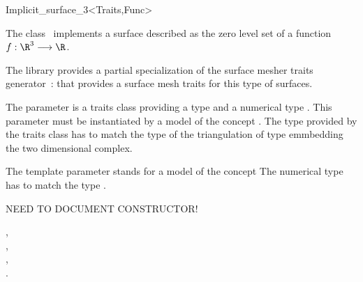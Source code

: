 

\begin{ccRefClass}{Implicit_surface_3<Traits,Func>}


\ccDefinition
  
The class \ccRefName\  implements a surface described 
as the zero level
set  of a function $f : \R^3 \longrightarrow \R$.


The library provides a partial specialization
of the  surface mesher traits generator~:
that provides a surface mesh traits for this type of surfaces.


The parameter  is a traits class providing 
a type  and a numerical type .
This parameter  must be instantiated by 
a model of the concept .
The  type provided by the traits class  
has to match  the  type of the
triangulation of  type  emmbedding
the two dimensional complex.

The template parameter   stands for a model
of the concept 
The numerical type  has to match
the type .

NEED TO DOCUMENT CONSTRUCTOR!


\ccSeeAlso
{},\\
,\\
, \\
.

\end{ccRefClass}


